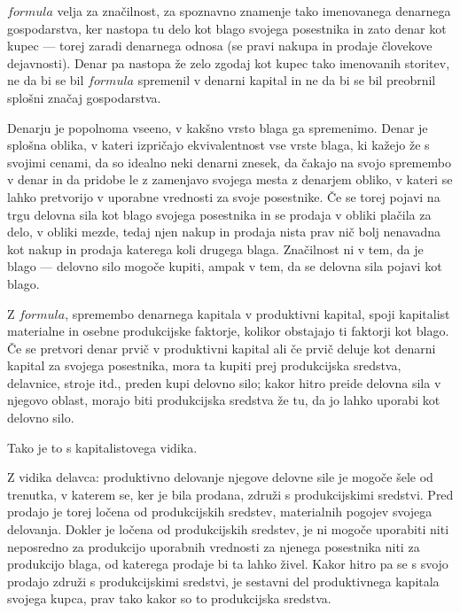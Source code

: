 \documentclass[kapital_02.tex]{subfiles}
\begin{document}
\( formula \) velja za značilnost, za spoznavno znamenje tako imenovanega denarnega gospodarstva, ker nastopa tu delo kot blago svojega posestnika in zato denar kot kupec --- torej zaradi denarnega odnosa (se pravi nakupa in prodaje človekove dejavnosti). Denar pa nastopa že zelo zgodaj kot kupec tako imenovanih storitev, ne da bi se bil \( formula \) spremenil v denarni kapital in ne da bi se bil preobrnil splošni značaj gospodarstva.

Denarju je popolnoma vseeno, v kakšno vrsto blaga ga spremenimo. Denar je splošna oblika, v kateri izpričajo ekvivalentnost vse vrste blaga, ki kažejo že s svojimi cenami, da so idealno neki denarni znesek, da čakajo na svojo spremembo v denar in da pridobe le z zamenjavo svojega mesta z denarjem obliko, v kateri se lahko pretvorijo v uporabne vrednosti za svoje posestnike. Če se torej pojavi na trgu delovna sila kot blago svojega posestnika in se prodaja v obliki plačila za delo, v obliki mezde, tedaj njen nakup in prodaja nista prav nič bolj nenavadna kot nakup in prodaja katerega koli drugega blaga. Značilnost ni v tem, da je blago --- delovno silo mogoče kupiti, ampak v tem, da se delovna sila pojavi kot blago.

Z \( formula \), spremembo denarnega kapitala v produktivni kapital, spoji kapitalist materialne in osebne produkcijske faktorje, kolikor obstajajo ti faktorji kot blago. Če se pretvori denar prvič v produktivni kapital ali če prvič deluje kot denarni kapital za svojega posestnika, mora ta kupiti prej produkcijska sredstva, delavnice, stroje itd., preden kupi delovno silo; kakor hitro preide delovna sila v njegovo oblast, morajo biti produkcijska sredstva že tu, da jo lahko uporabi kot delovno silo.

Tako je to s kapitalistovega vidika.

Z vidika delavca: produktivno delovanje njegove delovne sile je mogoče šele od trenutka, v katerem se, ker je bila prodana, združi s produkcijskimi sredstvi. Pred prodajo je torej ločena od produkcijskih sredstev, materialnih pogojev svojega delovanja. Dokler je ločena od produkcijskih sredstev, je ni mogoče uporabiti niti neposredno za produkcijo uporabnih vrednosti za njenega posestnika niti za produkcijo blaga, od katerega prodaje bi ta lahko živel. Kakor hitro pa se s svojo prodajo združi s produkcijskimi sredstvi, je sestavni del produktivnega kapitala svojega kupca, prav tako kakor so to produkcijska sredstva.
\end{document}
